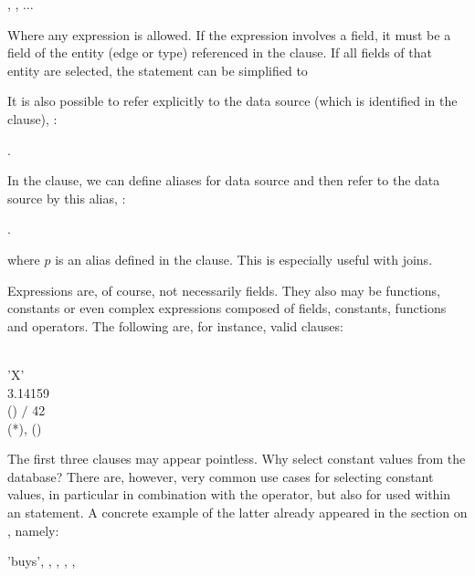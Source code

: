  , , $\dots$

Where any expression is allowed.
If the expression involves a field,
it must be a field of the entity (edge or type)
referenced in the  clause.
If all fields of that entity are selected,
the statement can be simplified to

 \keyword{$\ast$}

It is also possible to refer explicitly to the data source
(which is identified in the  clause), \eg:

 .

In the  clause, we can define aliases for data source
and then refer to the data source by this alias, \eg:

 .

where $p$ is an alias defined in the  clause.
This is especially useful with joins.

Expressions are, of course, not necessarily fields.
They also may be functions, constants or even complex expressions
composed of fields, constants, functions and operators.
The following are, for instance, valid  clauses:

\begin{minipage}{\textwidth}
  \\
 'X' \\
 3.14159 \\
 () $/$ 42 \\
 (*), ()
\end{minipage}

The first three clauses may appear pointless.
Why select constant values from the database?
There are, however, very common use cases
for selecting constant values, in particular
in combination with the  operator,
but also for  used within an
 statement. A concrete example
of the latter already appeared in the section
on , namely:

 'buys', ,
                         , 
                         , 
                         ,

